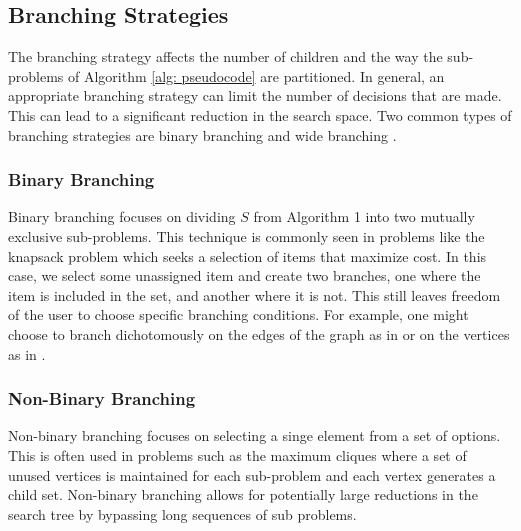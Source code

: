 \subsection{Branching Strategies}
	The branching strategy affects the number of children and the way the sub-problems of Algorithm \ref{alg: pseudocode} are partitioned. 
	In general, an appropriate branching strategy can limit the number of decisions that are made.
	This can lead to a significant reduction in the search space. 
	Two common types of branching strategies are binary branching and wide branching \cite{morrison2016branch}.
	
	\subsubsection{Binary Branching}
		Binary branching focuses on dividing $S$ from Algorithm 1 into two mutually exclusive sub-problems. This technique is commonly seen in problems like the knapsack problem which seeks a selection of items that maximize cost. In this case, we select some unassigned item and create two branches, one where the item is included in the set, and another where it is not. This still leaves freedom of the user to choose specific branching conditions. For example, one might choose to branch dichotomously on the edges of the graph as in \cite{rendl2010solving} or on the vertices as in \cite{baccari2020verifying}.
	
	\subsubsection{Non-Binary Branching}
		Non-binary branching focuses on selecting a singe element from a set of options. This is often used in problems such as the maximum cliques where a set of unused vertices is maintained for each sub-problem and each vertex generates a child set. Non-binary branching allows for potentially large reductions in the search tree by bypassing long sequences of sub problems. 
